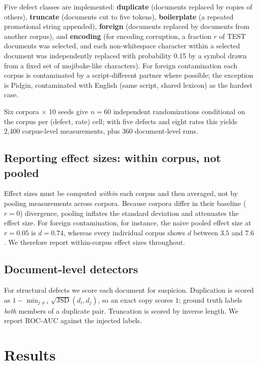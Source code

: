 \documentclass[conference]{IEEEtran}
\begin{document}
Five defect classes are implemented: \textbf{duplicate} (documents replaced by
copies of others), \textbf{truncate} (documents cut to five tokens),
\textbf{boilerplate} (a repeated promotional string appended), \textbf{foreign}
(documents replaced by documents from another corpus), and \textbf{encoding}
(for encoding corruption, a fraction $r$ of TEST documents was selected, and each non-whitespace character within a selected document was independently replaced with probability 0.15 by a symbol drawn from a fixed set of mojibake-like characters). For foreign contamination each corpus
is contaminated by a script-different partner where possible; the exception is
Pidgin, contaminated with English (same script, shared lexicon) as the hardest
case.

Six corpora $\times$ 10 seeds give $n=60$ independent randomizations conditional
on the corpus per (defect, rate) cell; with five defects and eight rates this 
yields 2{,}400 corpus-level measurements, plus 360 document-level runs.

\subsection{Reporting effect sizes: within corpus, not pooled}
\label{sec:pooling}
Effect sizes must be computed \emph{within} each corpus and then averaged, not by
pooling measurements across corpora. Because corpora differ in their baseline ($r=0$) 
divergence, pooling inflates the standard deviation and attenuates the effect size. 
For foreign contamination, for instance, the naive pooled effect size at $r=0.05$ 
is $d=0.74$, whereas every individual corpus shows $d$ between $3.5$ and $7.6$. 
We therefore report within-corpus effect sizes throughout.

\subsection{Document-level detectors}
For structural defects we score each document for suspicion. Duplication is
scored as $1-\min_{j\neq i}\sqrt{\mathrm{JSD}}(d_i,d_j)$, so an exact copy scores
$1$; ground truth labels \emph{both} members of a duplicate pair. Truncation is
scored by inverse length. We report ROC-AUC against the injected labels.

\section{Results}
\label{sec:results}
\end{document}
